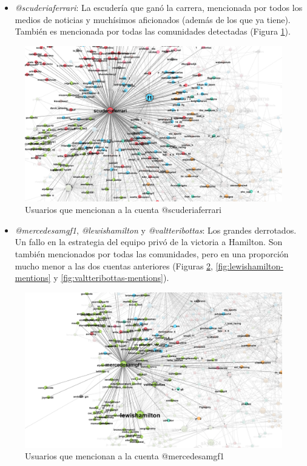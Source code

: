 \begin{itemize}
	\item \textit{@scuderiaferrari}: La escudería que ganó la carrera, mencionada por todos los medios de noticias y muchísimos aficionados (además de los que ya tiene). También es mencionada por todas las comunidades detectadas (Figura \ref{fig:scuderiaferrari-mentions}).
\end{itemize}

\begin{figure}[H]
	\centering
	\includegraphics[width=14cm]{img/scuderiaferrari-mentions}
	\caption{Usuarios que mencionan a la cuenta @scuderiaferrari}
	\label{fig:scuderiaferrari-mentions}
\end{figure}

\begin{itemize}	
	\item \textit{@mercedesamgf1}, \textit{@lewishamilton} y \textit{@valtteribottas}: Los grandes derrotados. Un fallo en la estrategia del equipo privó de la victoria a Hamilton. Son también mencionados por todas las comunidades, pero en una proporción mucho menor a las dos cuentas anteriores (Figuras \ref{fig:mercedesamgf1-mentions}, \ref{fig:lewishamilton-mentions} y \ref{fig:valtteribottas-mentions}).
\end{itemize}

\begin{figure}[H]
	\centering
	\includegraphics[width=14cm]{img/mercedesamgf1-mentions}
	\caption{Usuarios que mencionan a la cuenta @mercedesamgf1}
	\label{fig:mercedesamgf1-mentions}
\end{figure}

